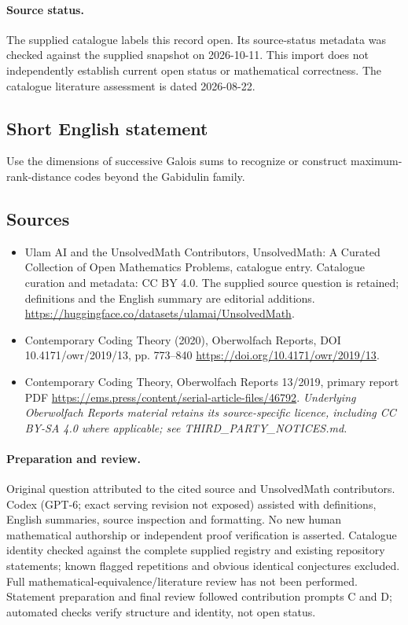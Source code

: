 \documentclass[11pt]{article}
\begin{document}
\paragraph{Source status.}
The supplied catalogue labels this record open. Its source-status metadata was checked against the supplied snapshot on 2026-10-11. This import does not independently establish current open status or mathematical correctness. The catalogue literature assessment is dated 2026-08-22.
\subsection{Short English statement}
Use the dimensions of successive Galois sums to recognize or construct maximum-rank-distance codes beyond the Gabidulin family.
\subsection{Sources}
\begin{itemize}
\item[S1] Ulam AI and the UnsolvedMath Contributors, UnsolvedMath: A Curated Collection of Open Mathematics Problems, catalogue entry. Catalogue curation and metadata: CC BY 4.0. The supplied source question is retained; definitions and the English summary are editorial additions.
\url{https://huggingface.co/datasets/ulamai/UnsolvedMath}.
\item[S2] Contemporary Coding Theory (2020), Oberwolfach Reports, DOI 10.4171/owr/2019/13, pp. 773--840
\url{https://doi.org/10.4171/owr/2019/13}.
\item[S3] Contemporary Coding Theory, Oberwolfach Reports 13/2019, primary report PDF
\url{https://ems.press/content/serial-article-files/46792}.
\textit{Underlying Oberwolfach Reports material retains its source-specific licence, including CC BY-SA 4.0 where applicable; see THIRD\_PARTY\_NOTICES.md.}
\end{itemize}
\paragraph{Preparation and review.}
Original question attributed to the cited source and UnsolvedMath contributors. Codex (GPT-6; exact serving revision not exposed) assisted with definitions, English summaries, source inspection and formatting. No new human mathematical authorship or independent proof verification is asserted. Catalogue identity checked against the complete supplied registry and existing repository statements; known flagged repetitions and obvious identical conjectures excluded. Full mathematical-equivalence/literature review has not been performed. Statement preparation and final review followed contribution prompts C and D; automated checks verify structure and identity, not open status.
\label{end:statement}
\end{document}
